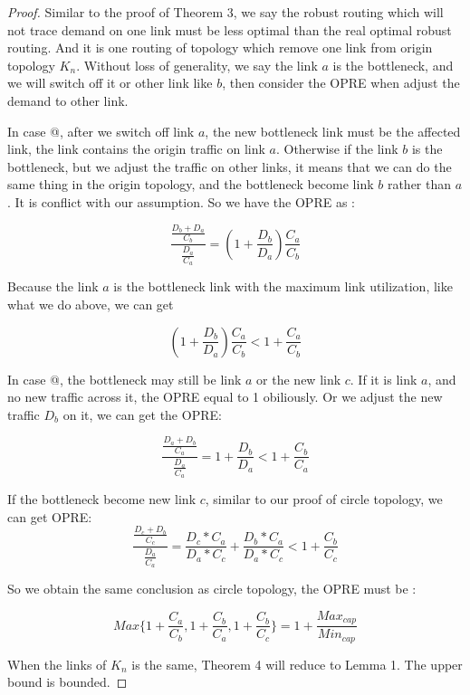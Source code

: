 \documentclass[conference]{IEEEtran}
\makeatletter
\newcommand{\Rmnum}[1]{\expandafter\@slowromancap\romannumeral #1@}
\makeatother
\begin{document}
\begin{proof}
Similar to the proof of Theorem 3, we say the robust routing which will not trace demand on one link must be less optimal than
the real optimal robust routing. And it is one routing of topology which remove one link from origin topology $K_n$. Without
loss of generality, we say the link $a$ is the bottleneck, and we will switch off it or other link like $b$, then consider
the OPRE when adjust the demand to other link.

In case \Rmnum{1}, after we switch off link $a$, the new bottleneck link must be the affected link, the link contains the origin 
traffic on link $a$. Otherwise if the link $b$ is the bottleneck, but we adjust the traffic on other links, it means that
we can do the same thing in the origin topology, and the bottleneck become link $b$ rather than $a$. It is conflict with our
assumption. So we have the OPRE as :

\begin{equation}
    \frac {\frac{D_b + D_a}{C_b}}{\frac{D_a}{C_a}} = (1+\frac{D_b}{D_a}) \frac{C_a}{C_b}
\end{equation}

Because the link $a$ is the bottleneck link with the maximum link utilization, like what we do above, we can get 

\begin{equation}
    (1+\frac{D_b}{D_a}) \frac{C_a}{C_b} < 1 + \frac{C_a}{C_b}
\end{equation}

In case \Rmnum{2}, the bottleneck may still be link $a$ or the new link $c$. If it is link $a$, and no new traffic across it,
the OPRE equal to 1 obiliously. Or we adjust the new traffic $D_b$ on it, we can get the OPRE:

\begin{equation}
    \frac{\frac{D_a + D_b}{C_a}}{\frac{D_a}{C_a}} = 1 + \frac{D_b}{D_a} < 1 + \frac{C_b}{C_a}
\end{equation}

If the bottleneck become new link $c$, similar to our proof of circle topology, we can get OPRE:
\begin{equation}
    \frac{\frac{D_c + D_b}{C_c}}{\frac{D_a}{C_a}} = \frac{D_c * C_a}{D_a * C_c} + \frac{D_b * C_a}{D_a * C_c} < 1 + \frac{C_b}{C_c}
\end{equation}

So we obtain the same conclusion as circle topology, the OPRE must be :

\begin{equation}
    Max\{1 + \frac{C_a}{C_b}, 1 + \frac{C_b}{C_a}, 1 + \frac{C_b}{C_c}\} = 1 + \frac{Max_{cap}}{Min_{cap}}
\end{equation}

When the links of $K_n$ is the same, Theorem 4 will reduce to Lemma 1. The upper bound is bounded.
\end{proof}
\end{document}

